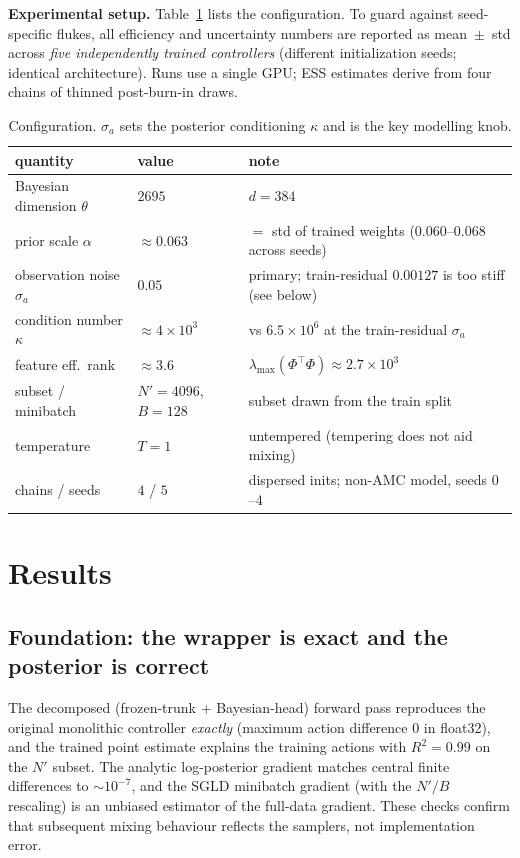 \documentclass[11pt]{article}
\begin{document}
\textbf{Experimental setup.} Table~\ref{tab:setup} lists the configuration. To guard against
seed-specific flukes, all efficiency and uncertainty numbers are reported as mean~$\pm$~std across
\emph{five independently trained controllers} (different initialization seeds; identical architecture).
Runs use a single GPU; ESS estimates derive from four chains of thinned post-burn-in draws.

\begin{table}[h]
\centering\small
\begin{tabular}{@{}lll@{}}
\toprule
quantity & value & note \\
\midrule
Bayesian dimension $\theta$ & $2695$ & $d=384$ \\
prior scale $\alpha$ & $\approx 0.063$ & $=$ std of trained weights ($0.060$--$0.068$ across seeds) \\
observation noise $\sigma_a$ & $0.05$ & primary; train-residual $0.00127$ is too stiff (see below) \\
condition number $\kappa$ & $\approx 4\times10^{3}$ & vs $6.5\times10^{6}$ at the train-residual $\sigma_a$ \\
feature eff.\ rank & $\approx 3.6$ & $\lambda_{\max}(\Phi^\top\Phi)\approx 2.7\times10^{3}$ \\
subset / minibatch & $N'=4096$, $B=128$ & subset drawn from the train split \\
temperature & $T=1$ & untempered (tempering does not aid mixing) \\
chains / seeds & $4$ / $5$ & dispersed inits; non-AMC model, seeds $0$--$4$ \\
\bottomrule
\end{tabular}
\caption{Configuration. $\sigma_a$ sets the posterior conditioning $\kappa$ and is the key modelling knob.}
\label{tab:setup}
\end{table}

\section{Results}

\subsection{Foundation: the wrapper is exact and the posterior is correct}\label{sec:foundation}
The decomposed (frozen-trunk + Bayesian-head) forward pass reproduces the original monolithic controller
\emph{exactly} (maximum action difference $0$ in float32), and the trained point estimate explains the
training actions with $R^2=0.99$ on the $N'$ subset. The analytic log-posterior gradient matches central
finite differences to $\sim\!10^{-7}$, and the SGLD minibatch gradient (with the $N'/B$ rescaling) is an
unbiased estimator of the full-data gradient. These checks confirm that subsequent mixing behaviour
reflects the samplers, not implementation error.
\end{document}

